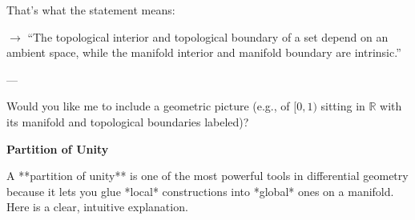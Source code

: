 \documentclass[10pt,a4paper]{report}
\begin{document}
\begin{enumerate}
That’s what the statement means:

$\rightarrow$ “The topological interior and topological boundary of a set depend on an ambient space, while the manifold interior and manifold boundary are intrinsic.”

---

Would you like me to include a geometric picture (e.g., of $[0,1)$ sitting in $\mathbb{R}$ with its manifold and topological boundaries labeled)?

\end{enumerate}

\newpage
\textbf{\Large{Partition of Unity}}

A **partition of unity** is one of the most powerful tools in differential geometry because it lets you glue *local* constructions into *global* ones on a manifold. Here is a clear, intuitive explanation.
\end{document}
